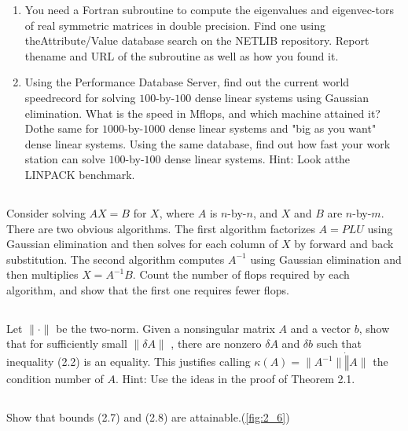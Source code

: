 \documentclass[a4paper]{ctexart}
\newcommand{\pf}{\textbf{\color{pink}{proof:}}}
\begin{document}
\begin{enumerate}
    \item  You need a Fortran subroutine to compute the eigenvalues and eigenvec-tors of real symmetric matrices in double precision.  Find one using theAttribute/Value database search on the NETLIB repository.  Report thename and URL of the subroutine as well as how you found it.
    \item   Using the Performance Database Server, find out the current world speedrecord for solving $100$-by-$100$ dense linear systems using Gaussian elimination.  What is the speed in Mflops, and which machine attained it?  Dothe same for $1000$-by-$1000$  dense linear  systems and "big as you want" dense linear systems.  Using the same database, find out how fast your work station  can  solve  $100$-by-$100$  dense  linear  systems.   Hint:  Look  atthe LINPACK benchmark. 
\end{enumerate}

\pf

\subsection{}
Consider solving $AX = B$ for $X$, where $A$ is $n$-by-$n$, and $X$ and $B$ are $n$-by-$m$. 
There are two obvious algorithms. The first algorithm factorizes $A = PLU$ using Gaussian elimination and then solves for
each column of $X$ by forward and back substitution. The second algorithm
computes $A^{-1}$ using Gaussian elimination and then multiplies $X = A^{-1}B$. Count the number of flops required by each algorithm, and show that the first one requires fewer flops.

\pf

\subsection{}
Let $\|\cdot\|$ be the two-norm. Given a nonsingular
matrix $A$ and a vector $b$, show that for sufficiently small $\|\delta A\|$ , there are nonzero
$\delta A$ and $\delta b$ such that inequality (2.2) is an equality. This justifies calling 
$\kappa(A) = \|A^{-1}\|\dot \|A\|$ the condition number of $A$. 
Hint: Use the ideas in the proof of Theorem 2.1.

\pf

\subsection{}
Show that bounds (2.7) and (2.8) are attainable.(\cref{fig:2_6})
\end{document}
